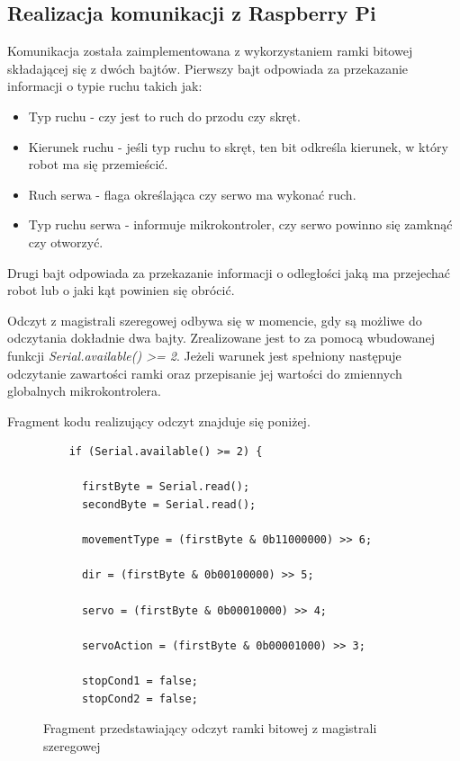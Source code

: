 \subsection{Realizacja komunikacji z Raspberry Pi}

Komunikacja została zaimplementowana z wykorzystaniem ramki bitowej składającej się z dwóch bajtów. Pierwszy bajt odpowiada za przekazanie informacji o typie ruchu takich jak:
\begin{itemize}
  \item Typ ruchu - czy jest to ruch do przodu czy skręt.
  \item Kierunek ruchu - jeśli typ ruchu to skręt, ten bit odkreśla kierunek, w który robot ma się przemieścić.
  \item Ruch serwa - flaga określająca czy serwo ma wykonać ruch.
  \item Typ ruchu serwa - informuje mikrokontroler, czy serwo powinno się zamknąć czy otworzyć. 
\end{itemize}

Drugi bajt odpowiada za przekazanie informacji o odległości jaką ma przejechać robot lub o jaki kąt powinien się obrócić. 

Odczyt z magistrali szeregowej odbywa się w momencie, gdy są możliwe do odczytania dokładnie dwa bajty. Zrealizowane jest to za pomocą wbudowanej funkcji \textit{Serial.available() >= 2}. Jeżeli warunek jest spełniony następuje odczytanie zawartości ramki oraz przepisanie jej wartości do zmiennych globalnych mikrokontrolera. 

Fragment kodu realizujący odczyt znajduje się poniżej.

\begin{figure}[H]
  \centering
  \begin{lstlisting}
    if (Serial.available() >= 2) {  
      
      firstByte = Serial.read();
      secondByte = Serial.read();

      movementType = (firstByte & 0b11000000) >> 6;

      dir = (firstByte & 0b00100000) >> 5;

      servo = (firstByte & 0b00010000) >> 4;

      servoAction = (firstByte & 0b00001000) >> 3;

      stopCond1 = false;
      stopCond2 = false;
  \end{lstlisting}
  \caption{Fragment przedstawiający odczyt ramki bitowej z magistrali szeregowej}
  \label{fig:read-uart}
\end{figure}

